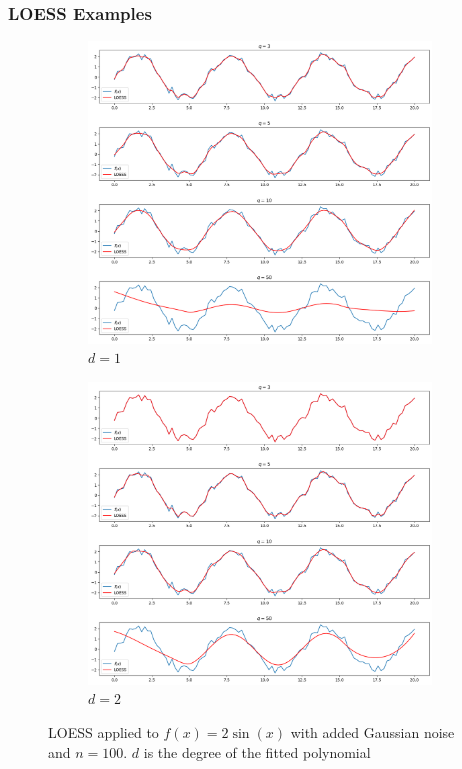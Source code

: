 \documentclass[9pt]{beamer}
\begin{document}
\begin{frame}
  \frametitle{LOESS Examples}
  \begin{figure}
    \centering
    \begin{subfigure}[b]{0.49\textwidth}
      \centering
      \includegraphics[width=\textwidth]{imgs/loess1}
      \caption{$d=1$}
  \end{subfigure}
  \begin{subfigure}[b]{0.49\textwidth}
    \centering
    \includegraphics[width=\textwidth]{imgs/loess2}
    \caption{$d=2$}
  \end{subfigure}
  \caption{LOESS applied to $f(x) = 2\sin(x)$ with added Gaussian noise and $n =
    100$. $d$ is the degree of the fitted polynomial}
\end{figure}

\end{frame}
\end{document}
